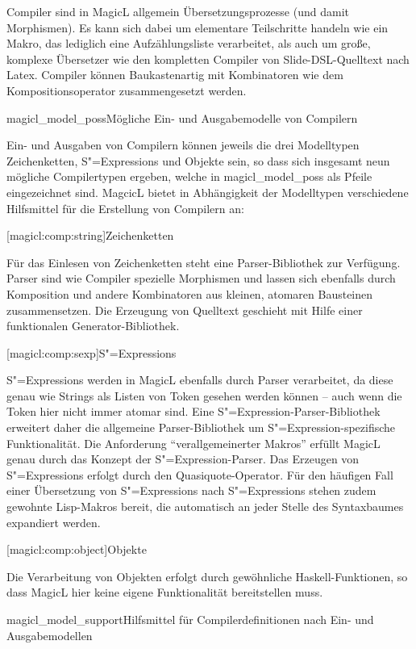 \documentclass[12pt, a4paper, bibgerm]{scrbook}
\newcommand\lsubsubsection{}
\newcommand\abb{}
\newcommand\fig{}
\newcommand{\sexp}{S"=Expression}
\newcommand{\sexps}{S"=Expressions}
\begin{document}
Compiler sind in MagicL allgemein Übersetzungsprozesse (und damit
Morphismen). Es kann sich dabei um elementare Teilschritte handeln wie
ein Makro, das lediglich eine Aufzählungsliste verarbeitet, als auch um
große, komplexe Übersetzer wie den kompletten Compiler von
Slide-DSL-Quelltext nach Latex. Compiler können Baukastenartig mit
Kombinatoren wie dem Kompositionsoperator zusammengesetzt werden.

\fig{magicl_model_poss}{Mögliche Ein- und Ausgabemodelle von Compilern}

Ein- und Ausgaben von Compilern können jeweils die drei Modelltypen
Zeichenketten, \sexps{} und Objekte sein, so dass sich insgesamt neun
mögliche Compilertypen ergeben, welche in \abb{magicl_model_poss} als
Pfeile eingezeichnet sind. MagcicL bietet in Abhängigkeit der
Modelltypen verschiedene Hilfsmittel für die Erstellung von Compilern
an:

\lsubsubsection[magicl:comp:string]{Zeichenketten}

Für das Einlesen von Zeichenketten steht eine Parser-Bibliothek zur
Verfügung. Parser sind wie Compiler spezielle Morphismen und lassen sich
ebenfalls durch Komposition und andere Kombinatoren aus kleinen,
atomaren Bausteinen zusammensetzen. Die Erzeugung von Quelltext
geschieht mit Hilfe einer funktionalen Generator-Bibliothek.

\lsubsubsection[magicl:comp:sexp]{\sexps}

\sexps{} werden in MagicL ebenfalls durch Parser verarbeitet, da diese
genau wie Strings als Listen von Token gesehen werden können -- auch
wenn die Token hier nicht immer atomar sind. Eine
\sexp{}-Parser-Bibliothek erweitert daher die allgemeine
Parser-Bibliothek um \sexp{}-spezifische Funktionalität. Die Anforderung
``verallgemeinerter Makros'' erfüllt MagicL genau durch das Konzept der
\sexp{}-Parser. Das Erzeugen von \sexps{} erfolgt durch den
Quasiquote-Operator. Für den häufigen Fall einer Übersetzung von
\sexps{} nach \sexps{} stehen zudem gewohnte Lisp-Makros bereit, die
automatisch an jeder Stelle des Syntaxbaumes expandiert werden.

\lsubsubsection[magicl:comp:object]{Objekte}

Die Verarbeitung von Objekten erfolgt durch gewöhnliche
Haskell-Funktionen, so dass MagicL hier keine eigene Funktionalität
bereitstellen muss. 

\medskip{}

\fig{magicl_model_support}{Hilfsmittel für Compilerdefinitionen nach
  Ein- und Ausgabemodellen}
\end{document}
